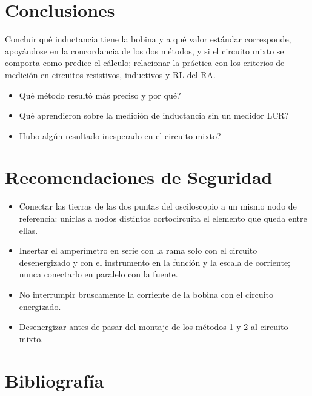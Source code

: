 \documentclass[12pt]{article}
\begin{document}
\section{Conclusiones}\label{sec:conclusiones}
Concluir qué inductancia tiene la bobina y a qué valor estándar corresponde, apoyándose en la concordancia de los dos métodos, y si el circuito mixto se comporta como predice el cálculo; relacionar la práctica con los criterios de medición en circuitos resistivos, inductivos y RL del RA.
\lineablanco
\begin{itemize}
  \item \textquestiondown{}Qué método resultó más preciso y por qué?
  \item \textquestiondown{}Qué aprendieron sobre la medición de inductancia sin un medidor LCR?
  \item \textquestiondown{}Hubo algún resultado inesperado en el circuito mixto?
\end{itemize}

\section{Recomendaciones de Seguridad}\label{sec:seguridad}
\begin{itemize}
  \item Conectar las tierras de las dos puntas del osciloscopio a un mismo nodo de referencia: unirlas a nodos distintos cortocircuita el elemento que queda entre ellas.
  \item Insertar el amperímetro en serie con la rama solo con el circuito desenergizado y con el instrumento en la función y la escala de corriente; nunca conectarlo en paralelo con la fuente.
  \item No interrumpir bruscamente la corriente de la bobina con el circuito energizado.
  \item Desenergizar antes de pasar del montaje de los métodos 1 y 2 al circuito mixto.
\end{itemize}

\section{Bibliografía}\label{sec:bibliografia}
\nocite{*}
\bibliografia
\end{document}
